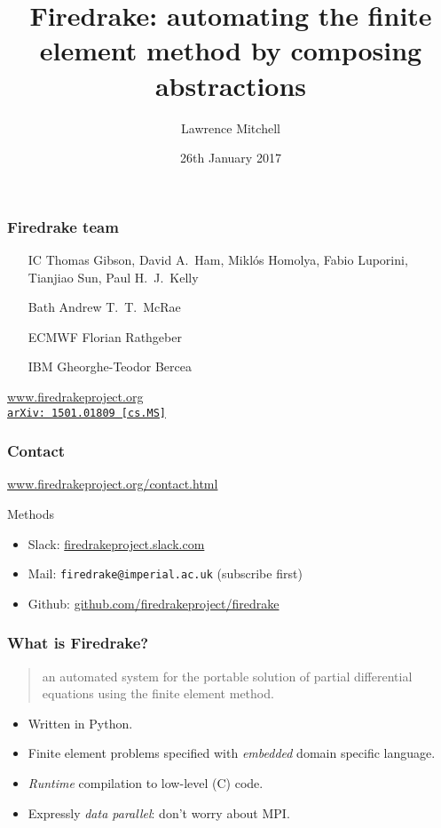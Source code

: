 \documentclass[presentation]{beamer}
\date{26th January 2017}
\author{Lawrence Mitchell\inst{1}}
\institute{
\inst{1}Departments of Computing and Mathematics, Imperial College
London
}
\title{Firedrake: automating the finite element method by composing
  abstractions}
\newcommand{\arxivlink}[2]{%
  \href{http://www.arxiv.org/abs/#1}%
  {{\small\texttt{arXiv:\,#1\,[#2]}}}%
}
\begin{document}
\maketitle

\begin{frame}
  \frametitle{Firedrake team}
  \begin{itemize}
  \item[IC] Thomas Gibson, David A.~Ham, Mikl\'os Homolya, {\color{gray}Fabio
    Luporini}, Tianjiao Sun, Paul H.~J.~Kelly
  \item[Bath] Andrew T.~T.~McRae
  \item[\color{gray}ECMWF] \color{gray}Florian Rathgeber
  \item[\color{gray}IBM] \color{gray}Gheorghe-Teodor Bercea
  \end{itemize}
  \begin{center}
    \url{www.firedrakeproject.org}\\
    \cite{Rathgeber:2016} \arxivlink{1501.01809}{cs.MS}
  \end{center}
\end{frame}

\begin{frame}
  \frametitle{Contact}

  \begin{center}
    \large
    \url{www.firedrakeproject.org/contact.html}
  \end{center}
  \begin{block}{Methods}
    \begin{itemize}
    \item Slack: \url{firedrakeproject.slack.com}
    \item Mail: \texttt{firedrake@imperial.ac.uk} (subscribe first)
    \item Github: \url{github.com/firedrakeproject/firedrake}
    \end{itemize}
  \end{block}
\end{frame}

\begin{frame}
  \frametitle{What is Firedrake?}
  \begin{quote}
    {\normalfont [\ldots]} an automated system for the portable solution of partial
    differential equations using the finite element method.
  \end{quote}

  \begin{itemize}
  \item Written in Python.
  \item Finite element problems specified with \emph{embedded} domain
    specific language.
  \item \emph{Runtime} compilation to low-level (C) code.
  \item Expressly \emph{data parallel}: don't worry about MPI.
  \end{itemize}
\end{frame}
\end{document}

